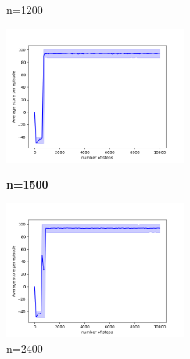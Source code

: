 \documentclass[a4paper,12pt]{article}
\begin{document}
\begin{CJK}{UTF8}{gbsn}
\begin{figure}[htbp]
\begin{minipage}[t]{0.45\textwidth}
		\caption{n=1200}
	\end{minipage}
	\begin{minipage}[t]{0.45\textwidth}
		\centering
		\includegraphics[width=6cm]{resource/n=1500/performance.png}
		\caption{\textbf{n=1500}}
	\end{minipage}
	\begin{minipage}[t]{0.45\textwidth}
	\centering
	\includegraphics[width=6cm]{resource/n=2400/performance.png}
	\caption{n=2400}
\end{minipage}
\end{figure}
\newpage

\end{CJK}
\end{document}
